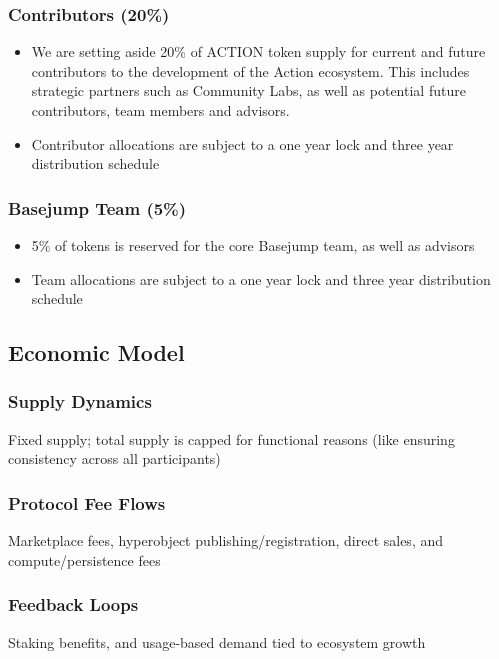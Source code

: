 \subsubsection{Contributors (20\%)}
\begin{itemize}
\item We are setting aside 20\% of ACTION token supply for current and future contributors to the development of the Action ecosystem. This includes strategic partners such as Community Labs, as well as potential future contributors, team members and advisors. \cite{Takahashi2023}
\item Contributor allocations are subject to a one year lock and three year distribution schedule
\end{itemize}

\subsubsection{Basejump Team (5\%)}
\begin{itemize}
\item 5\% of tokens is reserved for the core Basejump team, as well as advisors
\item Team allocations are subject to a one year lock and three year distribution schedule
\end{itemize}




\subsection{Economic Model}

\subsubsection{Supply Dynamics}
Fixed supply; total supply is capped for functional reasons (like ensuring consistency across all participants)

\subsubsection{Protocol Fee Flows}
Marketplace fees, hyperobject publishing/registration, direct sales, and compute/persistence fees

\subsubsection{Feedback Loops}
Staking benefits, and usage-based demand tied to ecosystem growth

